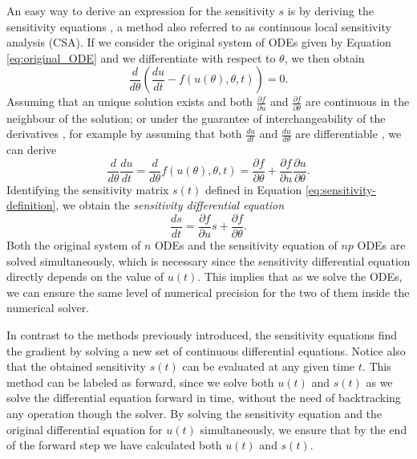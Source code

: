 An easy way to derive an expression for the sensitivity $s$ is by deriving the sensitivity equations \cite{ramsay2017dynamic}, a method also referred to as continuous local sensitivity analysis (CSA). 
If we consider the original system of ODEs given by Equation \eqref{eq:original_ODE} and we differentiate with respect to $\theta$, we then obtain
\begin{equation}
    \frac{d}{d\theta} \left( \frac{du}{dt}  - f(u(\theta), \theta, t) \right) = 0.
\end{equation}
Assuming that an unique solution exists and both $\frac{\partial f}{\partial u}$ and $\frac{\partial f}{\partial \theta}$ are continuous in the neighbour of the solution; or under the guarantee of interchangeability of the derivatives \cite{gronwall1919note}, for example by assuming that both $\frac{du}{dt}$ and $\frac{du}{d\theta}$ are differentiable \cite{math8111947}, we can derive
\begin{equation}
 \frac{d}{d\theta} \frac{du}{dt} 
 =
 \frac{d}{d\theta} f(u(\theta), \theta, t)
 = 
 \frac{\partial f}{\partial \theta}
 + 
 \frac{\partial f}{\partial u} \frac{\partial u}{\partial \theta}.
\end{equation}
Identifying the sensitivity matrix $s(t)$ defined in Equation \eqref{eq:sensitivity-definition}, we obtain the \textit{sensitivity differential equation} 
\begin{equation}
 \frac{ds}{dt} = \frac{\partial f}{\partial u} s + \frac{\partial f}{\partial \theta}.
 \label{eq:sensitivity_equations}
\end{equation}
Both the original system of $n$ ODEs and the sensitivity equation of $np$ ODEs are solved simultaneously, which is necessary since the sensitivity differential equation directly depends on the value of $u(t)$.  
This implies that as we solve the ODEs, we can ensure the same level of numerical precision for the two of them inside the numerical solver.

In contrast to the methods previously introduced, the sensitivity equations find the gradient by solving a new set of continuous differential equations.
Notice also that the obtained sensitivity $s(t)$ can be evaluated at any given time $t$. 
This method can be labeled as forward, since we solve both $u(t)$ and $s(t)$ as we solve the differential equation forward in time, without the need of backtracking any operation though the solver.
By solving the sensitivity equation and the original differential equation for $u(t)$ simultaneously, we ensure that by the end of the forward step we have calculated both $u(t)$ and $s(t)$. 


